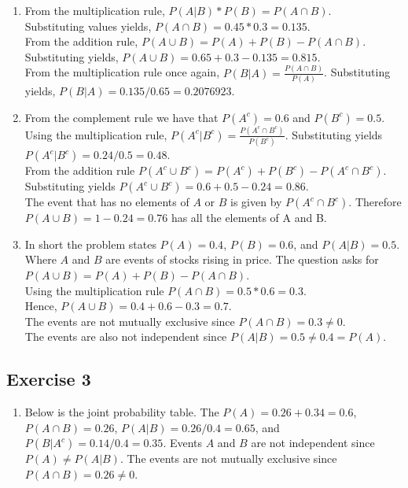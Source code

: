 \documentclass[
  letterpaper,
  DIV=11,
  numbers=noendperiod]{scrreprt}
\providecommand{\tightlist}{%
  \setlength{\itemsep}{0pt}\setlength{\parskip}{0pt}}\usepackage{longtable,booktabs,array}
\begin{document}
\begin{enumerate}
\def\labelenumi{\arabic{enumi}.}
\item
  From the multiplication rule, \(P(A|B)*P(B)=P(A \cap B)\).\\
  Substituting values yields, \(P(A \cap B)=0.45*0.3=0.135\).\\
  From the addition rule, \(P(A \cup B)=P(A)+P(B)-P(A \cap B)\).\\
  Substituting yields, \(P(A \cup B)=0.65+0.3-0.135=0.815\).\\
  From the multiplication rule once again,
  \(P(B|A)=\frac{P(A \cap B)}{P(A)}\). Substituting yields,
  \(P(B|A)=0.135/0.65=0.2076923\).
\item
  From the complement rule we have that \(P(A^c)=0.6\) and
  \(P(B^c)=0.5\).\\
  Using the multiplication rule,
  \(P(A^c|B^c)=\frac{P(A^c \cap B^c)}{P(B^c)}\). Substituting yields
  \(P(A^c|B^c)=0.24/0.5=0.48\).\\
  From the addition rule
  \(P(A^c \cup B^c)=P(A^c)+P(B^c)-P(A^c \cap B^c)\).\\
  Substituting yields \(P(A^c \cup B^c)=0.6+0.5-0.24=0.86\).\\
  The event that has no elements of \(A\) or \(B\) is given by
  \(P(A^c \cap B^c)\). Therefore \(P(A \cup B)=1-0.24=0.76\) has all the
  elements of A and B.
\item
  In short the problem states \(P(A)=0.4\), \(P(B)=0.6\), and
  \(P(A|B)=0.5\). Where \(A\) and \(B\) are events of stocks rising in
  price. The question asks for \(P(A \cup B)=P(A)+P(B)-P(A \cap B)\).\\
  Using the multiplication rule \(P(A \cap B)=0.5*0.6=0.3\).\\
  Hence, \(P(A \cup B)=0.4+0.6-0.3=0.7\).\\
  The events are not mutually exclusive since
  \(P(A \cap B)=0.3 \neq 0\).\\
  The events are also not independent since
  \(P(A|B)=0.5 \neq 0.4=P(A)\).
\end{enumerate}

\hypertarget{exercise-3-15}{%
\subsection*{Exercise 3}\label{exercise-3-15}}

\begin{enumerate}
\def\labelenumi{\arabic{enumi}.}
\tightlist
\item
  Below is the joint probability table. The \(P(A)=0.26+0.34=0.6\),
  \(P(A \cap B)=0.26\), \(P(A|B)=0.26/0.4=0.65\), and
  \(P(B|A^c)=0.14/0.4=0.35\). Events \(A\) and \(B\) are not independent
  since \(P(A) \neq P(A|B)\). The events are not mutually exclusive
  since \(P(A \cap B)=0.26 \neq 0\).
\end{enumerate}
\end{document}
